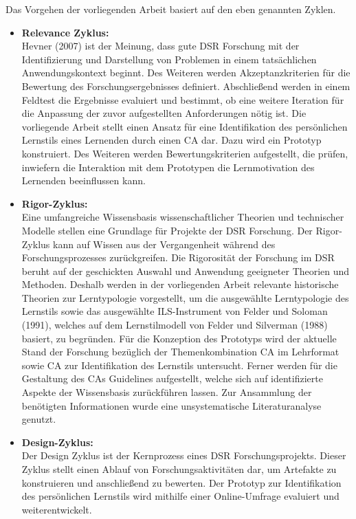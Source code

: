 Das Vorgehen der vorliegenden Arbeit basiert auf den eben genannten Zyklen.
\begin{itemize}
    \item \textbf{Relevance Zyklus:} \\
Hevner (2007) ist der Meinung, dass gute DSR Forschung mit der Identifizierung 
und Darstellung von Problemen in einem tatsächlichen Anwendungskontext beginnt.
Des Weiteren werden Akzeptanzkriterien für die Bewertung des Forschungsergebnisses definiert.
Abschließend werden in einem Feldtest die Ergebnisse evaluiert und bestimmt, ob 
eine weitere Iteration für die Anpassung der zuvor aufgestellten Anforderungen nötig ist. \parencite[89]{Hevner.2007}
Die vorliegende Arbeit stellt einen Ansatz für eine Identifikation des persönlichen Lernstils
eines Lernenden durch einen CA dar. Dazu wird ein Prototyp konstruiert.
Des Weiteren werden Bewertungskriterien aufgestellt, die prüfen, inwiefern die 
Interaktion mit dem Prototypen die Lernmotivation des Lernenden beeinflussen kann.
\item \textbf{Rigor-Zyklus:}\\
Eine umfangreiche Wissensbasis wissenschaftlicher Theorien und technischer Modelle stellen eine
Grundlage für Projekte der DSR Forschung. 
Der Rigor-Zyklus kann  
auf Wissen aus der Vergangenheit während des Forschungsprozesses 
zurückgreifen. Die Rigorosität der Forschung 
im DSR beruht auf der geschickten Auswahl und Anwendung geeigneter Theorien und Methoden. \parencite[90]{Hevner.2007}
Deshalb werden in der vorliegenden Arbeit relevante historische 
Theorien zur Lerntypologie vorgestellt,
um die ausgewählte Lerntypologie des Lernstils sowie das ausgewählte
ILS-Instrument von Felder und Soloman (1991), welches auf dem Lernstilmodell
 von Felder und Silverman (1988) basiert, zu begründen.
Für die Konzeption des Prototyps wird der aktuelle Stand der Forschung bezüglich der 
Themenkombination \glqq CA im Lehrformat\grqq{} sowie \glqq CA zur Identifikation des Lernstils\grqq{} untersucht.
Ferner werden für die Gestaltung des CAs Guidelines aufgestellt, welche sich 
auf identifizierte Aspekte der Wissensbasis zurückführen lassen.
Zur Ansammlung der benötigten Informationen wurde  
eine unsystematische Literaturanalyse genutzt.

\item \textbf{Design-Zyklus:}\\
Der Design Zyklus ist der Kernprozess eines DSR Forschungsprojekts. Dieser Zyklus stellt einen Ablauf 
von Forschungsaktivitäten dar, um Artefakte zu konstruieren und anschließend zu bewerten. \parencite[90 f.]{Hevner.2007}
Der Prototyp zur Identifikation des persönlichen Lernstils wird mithilfe einer Online-Umfrage evaluiert und weiterentwickelt.
\end{itemize}

